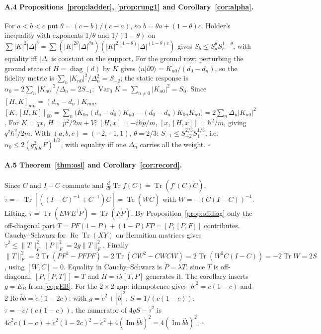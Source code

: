 \documentclass[11pt]{article}
\theoremstyle{definition}
\newcommand{\Tr}{\operatorname{Tr}}
\newcommand{\Var}{\operatorname{Var}}
\newcommand{\F}[1]{\lVert #1\rVert_F}
\begin{document}
\paragraph{A.4 Propositions~\ref{prop:ladder}, \ref{prop:rung1} and Corollary~\ref{cor:alpha}.} For $a<b<c$ put $\theta=(c-b)/(c-a)$, so $b=\theta a+(1-\theta)c$. H\"older's inequality with exponents $1/\theta$ and $1/(1-\theta)$ on $\sum|K|^2|\Delta|^b=\sum(|K|^{2\theta}|\Delta|^{\theta a})(|K|^{2(1-\theta)}|\Delta|^{(1-\theta)c})$ gives $S_b\le S_a^\theta S_c^{1-\theta}$, with equality iff $|\Delta|$ is constant on the support. For the ground row: perturbing the ground state of $H=\operatorname{diag}(d)$ by $K$ gives $\langle n|\partial0\rangle=K_{n0}/(d_0-d_n)$, so the fidelity metric is $\sum_n|K_{n0}|^2/\Delta_n^2=S_{-2}$; the static response is $\alpha_0=2\sum_n|K_{n0}|^2/\Delta_n=2S_{-1}$; $\Var_0K=\sum_{n\ne0}|K_{n0}|^2=S_0$. Since $[H,K]_{mn}=(d_m-d_n)K_{mn}$, $[K,[H,K]]_{00}=\sum_n\big(K_{0n}(d_n-d_0)K_{n0}-(d_0-d_n)K_{0n}K_{n0}\big)=2\sum_n\Delta_n|K_{n0}|^2$. For $K=qx$, $H=p^2/2m+V$: $[H,x]=-i\hbar p/m$, $[x,[H,x]]=\hbar^2/m$, giving $q^2\hbar^2/2m$. With $(a,b,c)=(-2,-1,1)$, $\theta=2/3$: $S_{-1}\le S_{-2}^{2/3}S_1^{1/3}$, i.e.\ $\alpha_0\le2(g_{KK}^2F)^{1/3}$, with equality iff one $\Delta_n$ carries all the weight. $\square$

\paragraph{A.5 Theorem~\ref{thm:osl} and Corollary~\ref{cor:record}.} Since $C$ and $I-C$ commute and $\frac d{dt}\Tr f(C)=\Tr(f'(C)\dot C)$, $\dot\tau=-\Tr[((I-C)^{-1}+C^{-1})\dot C]=\Tr(W\dot C)$ with $W=-(C(I-C))^{-1}$. Lifting, $\dot\tau=\Tr(EWE^\dagger\dot P)=\Tr(F\dot P)$. By Proposition~\ref{prop:offdiag} only the off-diagonal part $T=PF(1-P)+(1-P)FP=[P,[P,F]]$ contributes. Cauchy--Schwarz for $\operatorname{Re}\Tr(XY)$ on Hermitian matrices gives $\dot\tau^2\le\F{T}^2\F{\dot P}^2=2g\F{T}^2$. Finally $\F{T}^2=2\Tr(PF^2-PFPF)=2\Tr(CW^2-CWCW)=2\Tr(W^2C(I-C))=-2\Tr W=2S$, using $[W,C]=0$. Equality in Cauchy--Schwarz is $\dot P=\lambda T$; since $T$ is off-diagonal, $[P,[P,T]]=T$ and $H=i\lambda[T,P]$ generates it. The corollary inserts $g=E_B$ from \eqref{eq:gEB}. For the $2\times2$ gap: idempotence gives $|b|^2=c(1-c)$ and $2\operatorname{Re}\bar b\dot b=\dot c(1-2c)$; with $g=\dot c^2+|\dot b|^2$, $S=1/(c(1-c))$, $\dot\tau=-\dot c/(c(1-c))$, the numerator of $4gS-\dot\tau^2$ is $4\dot c^2c(1-c)+\dot c^2(1-2c)^2-\dot c^2+4(\operatorname{Im}\bar b\dot b)^2=4(\operatorname{Im}\bar b\dot b)^2$. $\square$
\end{document}
